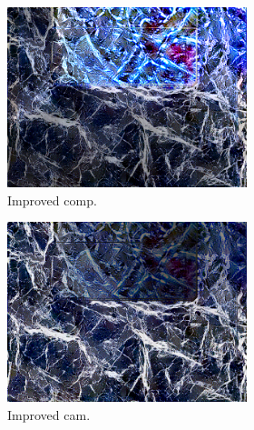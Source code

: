 \begin{figure}[]
\begin{subfigure}{\textwidth}
        \begin{subfigure}{0.24\textwidth}
            \centering
            \includegraphics[width=\textwidth]{images/04-experiment02/carpet/marble/improved_im.jpg}
            \caption*{Improved comp.}
        \end{subfigure}
        \hfill
        \begin{subfigure}{0.24\textwidth}
            \centering
            \includegraphics[width=\textwidth]{images/04-experiment02/carpet/marble/improved_proj.jpg}
            \caption*{Improved cam.}
        \end{subfigure}
        \hfill
        \begin{subfigure}{0.24\textwidth}
            \centering

\end{subfigure}
\end{subfigure}
\end{figure}
